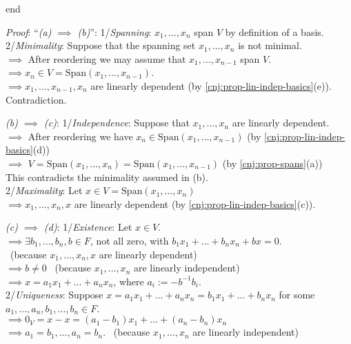 \documentclass[
  12pt,
  a4paper,
  twoside]{article}
\theoremstyle{plain}
\theoremstyle{definition}
\begin{document}
\csname end

\emph{Proof}:
``\emph{(a) \(\implies\) (b)}'': 1/\emph{Spanning}: \(x_1, \dots, x_n\) span \(V\) by definition of a basis.\\
2/\emph{Minimality}: Suppose that the spanning set \(x_1, \dots, x_n\) is not minimal.\\
\(\implies\) After reordering we may assume that \(x_1, \dots, x_{n-1}\) span \(V\).\\
\(\implies x_n \in V = \mathrm{Span}(x_1, \dots, x_{n-1})\).\\
\(\implies x_1, \dots, x_{n-1},x_n\) are linearly dependent (by \ref{cnj:prop-lin-indep-basics}(e)). Contradiction.

\emph{(b) \(\implies\) (c)}: 1/\emph{Independence}: Suppose that \(x_1, \dots, x_n\) are linearly dependent.\\
\(\implies\) After reordering we have \(x_n \in \mathrm{Span}(x_1, \dots, x_{n-1})\) (by \ref{cnj:prop-lin-indep-basics}(d))\\
\(\implies\) \(V = \mathrm{Span}(x_1, \dots, x_n) = \mathrm{Span}(x_1, \dots, x_{n-1})\) (by \ref{cnj:prop-spans}(a))\\
This contradicts the minimality assumed in (b).\\
2/\emph{Maximality}: Let \(x \in V = \mathrm{Span}(x_1, \dots, x_n)\)\\
\(\implies x_1, \dots, x_n, x\) are linearly dependent (by \ref{cnj:prop-lin-indep-basics}(c)).

\emph{(c) \(\implies\) (d)}: 1/\emph{Existence}: Let \(x \in V\).\\
\(\implies \exists b_1, \dots, b_n, b \in F\), not all zero, with \(b_1x_1 + \dots + b_nx_n + bx = 0\).\\
\hspace*{0.333em}\hfill~{(because \(x_1, \dots, x_n,x\) are linearly dependent)}\\
\(\implies b \neq 0\) \hfill~{(because \(x_1, \dots, x_n\) are linearly independent)}\\
\(\implies x = a_1x_1 + \dots + a_nx_n\), where \(a_{i} := -b^{-1}b_{i}\).\\
2/\emph{Uniqueness}: Suppose \(x = a_1x_1 + \dots + a_nx_n = b_1x_1 + \dots + b_nx_n\) for some \(a_1,\dots,a_n,b_1,\dots,b_n\in F\).\\
\(\implies 0_{V} = x-x = (a_1 - b_1)x_1 + \dots + (a_n - b_n)x_n\)\\
\(\implies a_1 = b_1, \dots, a_n=b_n\). \hfill~{(because \(x_1, \dots, x_n\) are linearly independent)}
\end{document}
